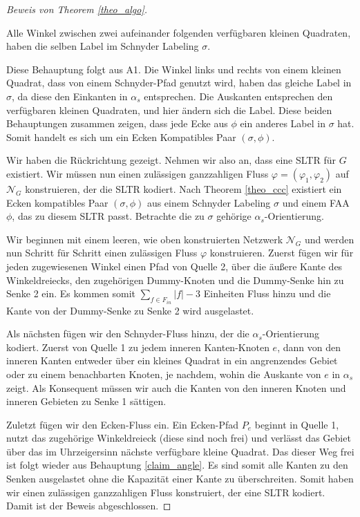 \begin{proof}[Beweis von Theorem \ref{theo_algo}]
\begin{claim}\label{claim_angle}
Alle Winkel zwischen zwei aufeinander folgenden verfügbaren kleinen Quadraten, haben die selben Label im Schnyder Labeling $\sigma$.
\end{claim}

Diese Behauptung folgt aus A1. Die Winkel links und rechts von einem kleinen Quadrat, dass von einem Schnyder-Pfad genutzt wird, haben das gleiche Label in $\sigma$, da diese den Einkanten in $\alpha_s$ entsprechen. Die Auskanten entsprechen den verfügbaren kleinen Quadraten, und hier ändern sich die Label. Diese beiden Behauptungen zusammen zeigen, dass jede Ecke aus $\phi$ ein anderes Label in $\sigma$ hat. Somit handelt es sich um ein Ecken Kompatibles Paar $(\sigma,\phi)$.

Wir haben die Rückrichtung gezeigt. Nehmen wir also an, dass eine SLTR für $G$ existiert. Wir müssen nun einen zulässigen ganzzahligen Fluss $\varphi=(\varphi_1,\varphi_2)$ auf $\mathcal{N}_G$ konstruieren, der die SLTR kodiert. Nach Theorem \ref{theo_ccc} existiert ein Ecken kompatibles Paar $(\sigma,\phi)$ aus einem Schnyder Labeling $\sigma$ und einem FAA $\phi$, das zu diesem SLTR passt. Betrachte die zu $\sigma$ gehörige $\alpha_s$-Orientierung.

Wir beginnen mit einem leeren, wie oben konstruierten Netzwerk $\mathcal{N}_G$ und werden nun Schritt für Schritt einen zulässigen Fluss $\varphi$ konstruieren. Zuerst fügen wir für jeden zugewiesenen Winkel einen Pfad von Quelle 2, über die äußere Kante des Winkeldreiecks, den zugehörigen Dummy-Knoten und die Dummy-Senke hin zu Senke 2 ein. Es kommen somit $\sum_{f \in F_{in}}|f|-3$ Einheiten Fluss hinzu und die Kante von der Dummy-Senke zu Senke 2 wird ausgelastet. 

Als nächsten fügen wir den Schnyder-Fluss hinzu, der die $\alpha_s$-Orientierung kodiert. Zuerst von Quelle 1 zu jedem inneren Kanten-Knoten $e$, dann von den inneren Kanten entweder über ein kleines Quadrat in ein angrenzendes Gebiet oder zu einem benachbarten Knoten, je nachdem, wohin die Auskante von $e$ in $\alpha_s$ zeigt. Als Konsequent müssen wir auch die Kanten von den inneren Knoten und inneren Gebieten zu Senke 1 sättigen.

Zuletzt fügen wir den Ecken-Fluss ein. Ein Ecken-Pfad $P_e$ beginnt in Quelle 1, nutzt das zugehörige Winkeldreieck (diese sind noch frei) und verlässt das Gebiet über das im Uhrzeigersinn nächste verfügbare kleine Quadrat. Das dieser Weg frei ist folgt wieder aus Behauptung \ref{claim_angle}. Es sind somit alle Kanten zu den Senken ausgelastet ohne die Kapazität einer Kante zu überschreiten. Somit haben wir einen zulässigen ganzzahligen Fluss konstruiert, der eine SLTR kodiert. Damit ist der Beweis abgeschlossen.
\end{proof}

